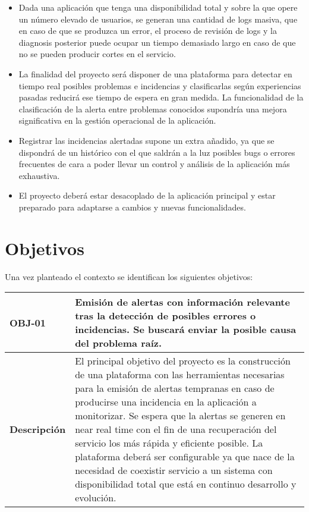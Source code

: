 \begin{itemize}
\item Dada una aplicación que tenga una disponibilidad total y sobre la que opere un número elevado
de usuarios, se generan una cantidad de logs masiva, que en caso de que se produzca un error, el proceso de revisión de logs y la diagnosis posterior puede ocupar un tiempo
demasiado largo en caso de que no se pueden producir cortes en el servicio.

\item La finalidad del proyecto será disponer de una plataforma para detectar en tiempo real posibles problemas e incidencias y
clasificarlas según experiencias pasadas reducirá ese tiempo de espera en gran medida. La funcionalidad de la clasificación de la alerta entre problemas conocidos supondría una mejora significativa en la gestión operacional de la aplicación.

\item Registrar las incidencias alertadas supone un extra añadido, ya que se dispondrá de un histórico
con el que saldrán a la luz posibles bugs o errores frecuentes de cara a poder llevar un control
y análisis de la aplicación más exhaustiva.  

\item El proyecto deberá estar desacoplado de la aplicación principal y estar preparado para adaptarse a cambios y nuevas funcionalidades.

\end{itemize}



\section{Objetivos}

Una vez planteado el contexto se identifican los siguientes objetivos:


\begin{table}[H]
\centering
\renewcommand{\arraystretch}{1.5}
\begin{tabular}{| p{2.5cm} | p{10cm} |}
\hline
\bf{OBJ-01} \cellcolor{Gray} & \textbf{Emisión de alertas con información relevante tras la detección de posibles errores o
incidencias. Se buscará enviar la posible causa del problema raíz.} \\
\hline
\bf{Descripción} \cellcolor{Gray} & 
El principal objetivo del proyecto es la construcción de una plataforma con las herramientas necesarias para la emisión de alertas tempranas en caso de producirse una incidencia en la aplicación a monitorizar. Se espera que la alertas se generen en near real time con el fin de una recuperación del servicio los más rápida y eficiente posible. La plataforma deberá ser configurable ya que nace de la necesidad de coexistir servicio a un sistema con disponibilidad total que está en continuo desarrollo y evolución.
\\
\hline
\end{tabular}
\end{table}


